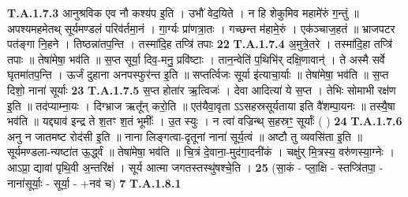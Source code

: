 \documentclass[17pt]{extarticle}
\begin{document}
                  \newline
                                                                  \textbf{ T.A.1.7.3} \newline
                  आनुश्रविक एव नौ कश्य॑प इ॒ति । उभौ॑ वेद॒यिते ।  न हि शेकुमिव महामे॑रुं ग॒न्तुं ॥  अपश्यमहमेतथ् सूर्यमण्डलं परिव॑र्तमा॒नं ।  गा॒र्ग्यः प्रा॑णत्रा॒तः । गच्छन्त म॑हामे॒रुं । एक॑ञ्चाज॒हतं ॥ भ्राजपटर पत॑ङ्गा नि॒हने । तिष्ठन्ना॑तप॒न्ति । तस्मा॑दि॒ह तप्त्रि॑ तपाः \textbf{ 22} \newline
                  \newline
                                                                  \textbf{ T.A.1.7.4} \newline
                  अ॒मुत्रे॒तरे । तस्मा॑दि॒हा तप्त्रि॑ तपाः ॥ तेषा॑मेषा॒ भव॑ति ॥ स॒प्त सूर्या॒ दिव॒-मनु॒ प्रवि॑ष्टाः । तान॒न्वेति॑ प॒थिभि॑र् दक्षि॒णावान्॑ । ते अस्मै सर्वे घृतमा॑तप॒न्ति । ऊर्जं दुहाना अनपस्फुर॑न्त इ॒ति ॥  सप्तर्त्विजः सूर्या इ॑त्याचा॒र्याः ॥ तेषा॑मेषा॒ भव॑ति ॥  स॒प्त दिशो॒ नाना॑ सूर्याः \textbf{ 23} \newline
                  \newline
                                                                  \textbf{ T.A.1.7.5} \newline
                  स॒प्त होता॑र ऋ॒त्विजः॑ । देवा आदित्या॑ ये स॒प्त ।  तेभिः सोमाभी रक्ष॑ण इ॒ति ॥ तद॑प्याम्ना॒यः । दिग्भ्राज ऋतू᳚न् करो॒ति ॥ एत॑यैवा॒वृता ऽऽसहस्रसूर्यताया इति वै॑शम्पा॒यनः ॥ तस्यै॒षा भव॑ति ॥  यद्द्याव॑ इन्द्र ते श॒तꣳ श॒तं भूमीः᳚ । उ॒त स्युः ।  न त्वा॑ वज्रिन्थ् स॒हस्रꣳ॒॒ सूर्याः᳚ ( ) \textbf{ 24} \newline
                  \newline
                                                                  \textbf{ T.A.1.7.6} \newline
                  अनु न जातमष्ट रोद॑सी इ॒ति ॥ नाना लिङ्गत्वा-दृतूनां नाना॑ सूर्य॒त्वं ॥ अष्टौ तु व्यवसि॑ता इ॒ति ॥ सूर्यमण्डला-न्यष्टा॑त ऊ॒र्द्ध्वं ॥  तेषा॑मेषा॒ भव॑ति ॥ चि॒त्रं दे॒वाना॒-मुद॑गा॒दनी॑कं । चक्षु॑र् मि॒त्रस्य॒ वरु॑णस्या॒ग्नेः । आऽप्रा॒ द्यावा॑ पृथि॒वी अ॒न्तरि॑क्षं ।  सूर्य आत्मा जगतस्तस्थु॑षश्चे॒ति । \textbf{ 25} \newline
                  \newline
                                                        (सा॒कं - प्ला॒क्षि - स्तप्त्रि॑तपा॒ - नाना॑सूर्याः॒ - सूर्या॒ - +नव॑ च) \textbf{7} \newline \newline
                                \textbf{ T.A.1.8.1} \newline
\end{document}
